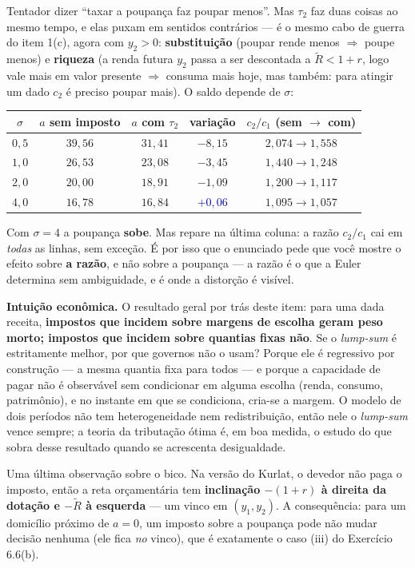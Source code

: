 \documentclass[11pt, a4paper]{article}
\newcommand{\intuicao}[1]{%
  \medskip\noindent\textcolor{midblue}{\textbf{Intuição econômica.}} #1\par}
\newcommand{\resp}[1]{%
  \ifmmode {\color{darkblue}#1}\else\textcolor{darkblue}{\textbf{#1}}\fi}
\newcommand{\Rt}{\widetilde{R}}
\begin{document}
\begin{tcolorbox}[trapbox, title={O que NÃO se pode concluir: o imposto sobre a poupança não necessariamente reduz a poupança}]
\small
Tentador dizer ``taxar a poupança faz poupar menos''. Mas $\tau_2$ faz duas coisas ao mesmo
tempo, e elas puxam em sentidos contrários --- é o mesmo cabo de guerra do item 1(c), agora
com $y_2>0$: \textbf{substituição} (poupar rende menos $\Rightarrow$ poupe menos) e
\textbf{riqueza} (a renda futura $y_2$ passa a ser descontada a $\Rt<1+r$, logo vale mais
em valor presente $\Rightarrow$ consuma mais hoje, mas também: para atingir um dado $c_2$ é
preciso poupar mais). O saldo depende de $\sigma$:

\smallskip
\begin{center}
\small
\begin{tabular}{@{}ccccc@{}}
\toprule
$\sigma$ & $a$ sem imposto & $a$ com $\tau_2$ & variação & $c_2/c_1$ (sem $\to$ com) \\
\midrule
$0{,}5$ & $39{,}56$ & $31{,}41$ & $-8{,}15$ & $2{,}074 \to 1{,}558$ \\
$1{,}0$ & $26{,}53$ & $23{,}08$ & $-3{,}45$ & $1{,}440 \to 1{,}248$ \\
$2{,}0$ & $20{,}00$ & $18{,}91$ & $-1{,}09$ & $1{,}200 \to 1{,}117$ \\
$4{,}0$ & $16{,}78$ & $16{,}84$ & \resp{$+0{,}06$} & $1{,}095 \to 1{,}057$ \\
\bottomrule
\end{tabular}
\end{center}

\smallskip
Com $\sigma=4$ a poupança \textbf{sobe}. Mas repare na última coluna: a razão $c_2/c_1$
cai em \emph{todas} as linhas, sem exceção. É por isso que o enunciado pede que você mostre
o efeito sobre \textbf{a razão}, e não sobre a poupança --- a razão é o que a Euler
determina sem ambiguidade, e é onde a distorção é visível.
\end{tcolorbox}

\intuicao{O resultado geral por trás deste item: para uma dada receita, \textbf{impostos
que incidem sobre margens de escolha geram peso morto; impostos que incidem sobre quantias
fixas não}. Se o \emph{lump-sum} é estritamente melhor, por que governos não o usam? Porque
ele é regressivo por construção --- a mesma quantia fixa para todos --- e porque a
capacidade de pagar não é observável sem condicionar em alguma escolha (renda, consumo,
patrimônio), e no instante em que se condiciona, cria-se a margem. O modelo de dois períodos
não tem heterogeneidade nem redistribuição, então nele o \emph{lump-sum} vence sempre; a
teoria da tributação ótima é, em boa medida, o estudo do que sobra desse resultado quando
se acrescenta desigualdade.

Uma última observação sobre o bico. Na versão do Kurlat, o devedor não paga o imposto, então
a reta orçamentária tem \textbf{inclinação $-(1+r)$ à direita da dotação e $-\Rt$ à esquerda}
--- um vinco em $(y_1,y_2)$. A consequência: para um domicílio próximo de $a=0$, um imposto
sobre a poupança pode não mudar decisão nenhuma (ele fica \emph{no} vinco), que é
exatamente o caso (iii) do Exercício 6.6(b).}
\end{document}
